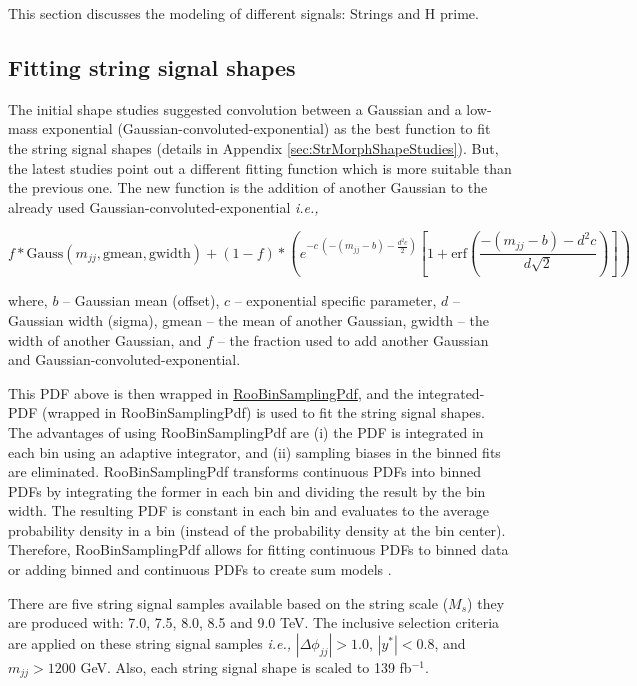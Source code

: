 
This section discusses the modeling of different signals: Strings and H prime.


\subsection{Fitting string signal shapes}

The initial shape studies suggested convolution between a Gaussian and a low-mass exponential (Gaussian-convoluted-exponential) as the best function to fit the string signal shapes (details in Appendix \ref{sec:StrMorphShapeStudies}). But, the latest studies point out a different fitting function which is more suitable than the previous one. The new function is the addition of another Gaussian to the already used Gaussian-convoluted-exponential \textit{i.e.,}

\begin{equation}
 f*\text{Gauss}(m_{jj}, \text{gmean}, \text{gwidth}) + (1-f) * (e^{-c~(-(m_{jj}-b)-\frac{d^{2}c}{2})}[1+\mathrm{erf}(\frac{-(m_{jj}-b)-d^{2}c}{d\sqrt{2}})])
\end{equation}

where, $b$ -- Gaussian mean (offset), $c$ -- exponential specific parameter, $d$ -- Gaussian width (sigma), gmean -- the mean of another Gaussian, gwidth -- the width of another Gaussian, and $f$ -- the fraction used to add another Gaussian and Gaussian-convoluted-exponential. 

This PDF above is then wrapped in \href{https://root.cern/doc/v624/classRooBinSamplingPdf.html}{RooBinSamplingPdf}, and the integrated-PDF (wrapped in RooBinSamplingPdf) is used to fit the string signal shapes. The advantages of using RooBinSamplingPdf are (i) the PDF is integrated in each bin using an adaptive integrator, and (ii) sampling biases in the binned fits are eliminated. RooBinSamplingPdf transforms continuous PDFs into binned PDFs by integrating the former in each bin and dividing the result by the bin width. The resulting PDF is constant in each bin and evaluates to the average probability density in a bin (instead of the probability density at the bin center). Therefore, RooBinSamplingPdf allows for fitting continuous PDFs to binned data or adding binned and continuous PDFs to create sum models \cite{Gligorov:2021}. 

There are five string signal samples available based on the string scale ($M_{s}$) they are produced with: 7.0, 7.5, 8.0, 8.5 and 9.0 TeV. The inclusive selection criteria are applied on these string signal samples \textit{i.e.,} $|\Delta\phi_{jj}|>1.0$, $|y^*|<0.8$, and $m_{jj}>1200$ GeV. Also, each string signal shape is scaled to 139 fb$^{-1}$. 

